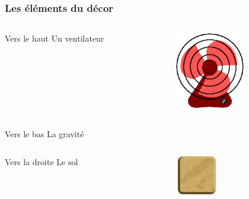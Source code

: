\documentclass{beamer}
\begin{document}
\begin{frame}
\frametitle{Les éléments du décor}


\begin{columns}
	\begin{column}{0.8\textwidth}
		\begin{block}{Vers le haut}
			Un ventilateur
		\end{block}
	\end{column}
	\pause
	\begin{column}{0.2\textwidth}
		\includegraphics[scale=0.4]{images/fan.png}
	\end{column}
\end{columns}
\pause
\begin{columns}
	\begin{column}{0.8\textwidth}
		\begin{block}{Vers le bas}
			La gravité
		\end{block}
	\end{column}
	\begin{column}{0.2\textwidth}
	\end{column}
\end{columns}
\pause
\begin{columns}
	\begin{column}{0.8\textwidth}
		\begin{block}{Vers la droite}
			Le sol
		\end{block}
	\end{column}
	\pause
	\begin{column}{0.2\textwidth}
		\includegraphics[scale=0.4]{images/groundblock.png}
	\end{column}
\end{columns}

\end{frame}
\end{document}
